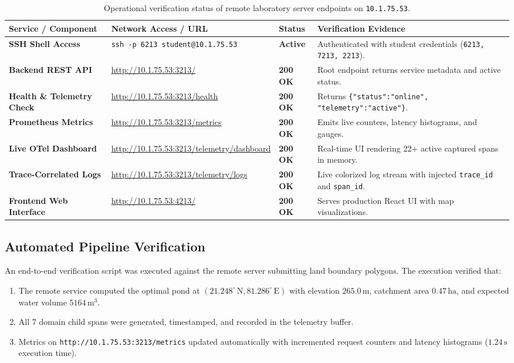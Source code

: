 \documentclass[11pt,a4paper]{article}
\begin{document}
\begin{table}[H]
    \centering
    \small
    \begin{tabularx}{\textwidth}{l l l X}
        \toprule
        \textbf{Service / Component} & \textbf{Network Access / URL} & \textbf{Status} & \textbf{Verification Evidence} \\
        \midrule
        \textbf{SSH Shell Access} & \texttt{ssh -p 6213 student@10.1.75.53} & \textbf{Active} & Authenticated with student credentials (\texttt{6213, 7213, 2213}). \\
        \textbf{Backend REST API} & \url{http://10.1.75.53:3213/} & \textbf{200 OK} & Root endpoint returns service metadata and active status. \\
        \textbf{Health \& Telemetry Check} & \url{http://10.1.75.53:3213/health} & \textbf{200 OK} & Returns \texttt{\{"status":"online", "telemetry":"active"\}}. \\
        \textbf{Prometheus Metrics} & \url{http://10.1.75.53:3213/metrics} & \textbf{200 OK} & Emits live counters, latency histograms, and gauges. \\
        \textbf{Live OTel Dashboard} & \url{http://10.1.75.53:3213/telemetry/dashboard} & \textbf{200 OK} & Real-time UI rendering 22+ active captured spans in memory. \\
        \textbf{Trace-Correlated Logs} & \url{http://10.1.75.53:3213/telemetry/logs} & \textbf{200 OK} & Live colorized log stream with injected \texttt{trace\_id} and \texttt{span\_id}. \\
        \textbf{Frontend Web Interface} & \url{http://10.1.75.53:4213/} & \textbf{200 OK} & Serves production React UI with map visualizations. \\
        \bottomrule
    \end{tabularx}
    \caption{Operational verification status of remote laboratory server endpoints on \texttt{10.1.75.53}.}
    \label{tab:remote_endpoints}
\end{table}

\subsection{Automated Pipeline Verification}
An end-to-end verification script was executed against the remote server submitting land boundary polygons. The execution verified that:
\begin{enumerate}[leftmargin=*]
    \item The remote service computed the optimal pond at $(21.248^\circ\,\text{N}, 81.286^\circ\,\text{E})$ with elevation $265.0\,\text{m}$, catchment area $0.47\,\text{ha}$, and expected water volume $5164\,\text{m}^3$.
    \item All 7 domain child spans were generated, timestamped, and recorded in the telemetry buffer.
    \item Metrics on \texttt{http://10.1.75.53:3213/metrics} updated automatically with incremented request counters and latency histograms ($1.24\,\text{s}$ execution time).
\end{enumerate}
\end{document}
